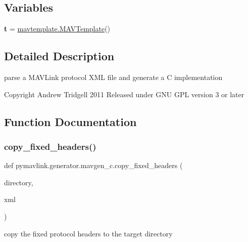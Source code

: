 \subsection*{Variables}
\begin{DoxyCompactItemize}
\item 
\mbox{\label{namespacepymavlink_1_1generator_1_1mavgen__c_a774f91c5f8caa0b1c80610c28d05277b}} 
{\bfseries t} = \hyperlink{classpymavlink_1_1generator_1_1mavtemplate_1_1MAVTemplate}{mavtemplate.\+M\+A\+V\+Template}()
\end{DoxyCompactItemize}


\subsection{Detailed Description}
\begin{DoxyVerb}parse a MAVLink protocol XML file and generate a C implementation

Copyright Andrew Tridgell 2011
Released under GNU GPL version 3 or later
\end{DoxyVerb}
 

\subsection{Function Documentation}
\mbox{\label{namespacepymavlink_1_1generator_1_1mavgen__c_a3a09ff51409f0e3465b69f6760f622fb}} 
\subsubsection{\texorpdfstring{copy\+\_\+fixed\+\_\+headers()}{copy\_fixed\_headers()}}
{\footnotesize\ttfamily def pymavlink.\+generator.\+mavgen\+\_\+c.\+copy\+\_\+fixed\+\_\+headers (\begin{DoxyParamCaption}\item[{}]{directory,  }\item[{}]{xml }\end{DoxyParamCaption})}

\begin{DoxyVerb}copy the fixed protocol headers to the target directory\end{DoxyVerb}
 \mbox{\label{namespacepymavlink_1_1generator_1_1mavgen__c_a40a6fdda7e5220bab2069a50a82afe48}} 
